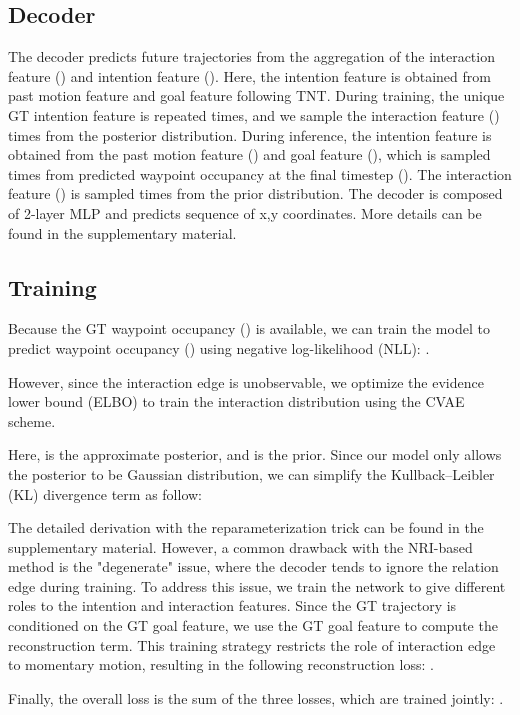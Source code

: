 \documentclass{article} \usepackage{iclr2023_conference,times}
\begin{document}
\subsection{Decoder}
\label{sec:decoder}
The decoder predicts future trajectories from the aggregation of the interaction feature () and intention feature ().
Here, the intention feature is obtained from past motion feature and goal feature following TNT.
During training, the unique GT intention feature is repeated  times, and we sample the interaction feature ()  times from the posterior distribution.
During inference, the intention feature is obtained from the past motion feature () and goal feature (), which is sampled  times from predicted waypoint occupancy at the final timestep ().
The interaction feature () is sampled  times from the prior distribution.
The decoder is composed of 2-layer MLP and predicts sequence of x,y coordinates. 
More details can be found in the supplementary material.

\subsection{Training}
\label{method_training}
Because the GT waypoint occupancy () is available, we can train the model to predict waypoint occupancy () using negative log-likelihood (NLL): .

However, since the interaction edge  is unobservable, we optimize the evidence lower bound (ELBO) to train the interaction distribution using the CVAE scheme.

Here,  is the approximate posterior, and  is the prior.
Since our model only allows the posterior to be Gaussian distribution, we can simplify the Kullback–Leibler (KL) divergence term as follow:

The detailed derivation with the reparameterization trick can be found in the supplementary material.
However, a common drawback with the NRI-based method is the "degenerate" issue, where the decoder tends to ignore the relation edge during training. 
To address this issue, we train the network to give different roles to the intention and interaction features. 
Since the GT trajectory is conditioned on the GT goal feature, we use the GT goal feature to compute the reconstruction term.
This training strategy restricts the role of interaction edge to momentary motion, resulting in the following reconstruction loss: .

Finally, the overall loss is the sum of the three losses, which are trained jointly:
.
\end{document}

